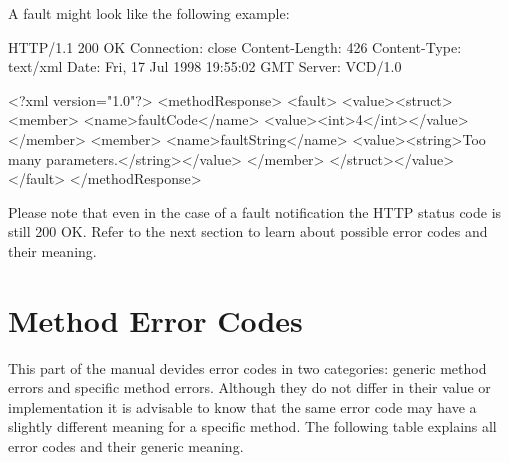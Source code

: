 A fault might look like the following example:

\begin{lstverbatim}
HTTP/1.1 200 OK
Connection: close
Content-Length: 426
Content-Type: text/xml
Date: Fri, 17 Jul 1998 19:55:02 GMT
Server: VCD/1.0

<?xml version="1.0"?>
<methodResponse>
  <fault>
    <value><struct>
      <member>
        <name>faultCode</name>
        <value><int>4</int></value>
      </member>
      <member>
        <name>faultString</name>
        <value><string>Too many parameters.</string></value>
      </member>
    </struct></value>
  </fault>
</methodResponse>
\end{lstverbatim}

Please note that even in the case of a fault notification the HTTP status code
is still 200 OK. Refer to the next section to learn about possible error codes
and their meaning.


\section{Method Error Codes}

This part of the manual devides error codes in two categories: generic method
errors and specific method errors. Although they do not differ in their value
or implementation it is advisable to know that the same error code may have a
slightly different meaning for a specific method. The following table explains
all error codes and their generic meaning.

